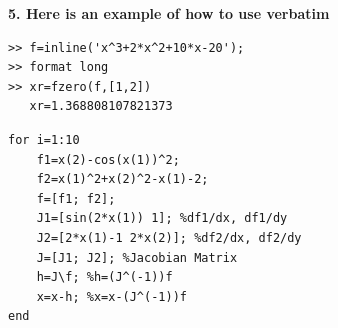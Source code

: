 \documentclass[12pt]{article}
\begin{document}
\newpage
\noindent \textbf{5. Here is an example of how to use verbatim} 

\begin{verbatim}
>> f=inline('x^3+2*x^2+10*x-20');
>> format long
>> xr=fzero(f,[1,2])
   xr=1.368808107821373
\end{verbatim}




\begin{verbatim}
for i=1:10
    f1=x(2)-cos(x(1))^2;
    f2=x(1)^2+x(2)^2-x(1)-2;
    f=[f1; f2];
    J1=[sin(2*x(1)) 1]; %df1/dx, df1/dy
    J2=[2*x(1)-1 2*x(2)]; %df2/dx, df2/dy
    J=[J1; J2]; %Jacobian Matrix
    h=J\f; %h=(J^(-1))f
    x=x-h; %x=x-(J^(-1))f
end
\end{verbatim}
\end{document}

